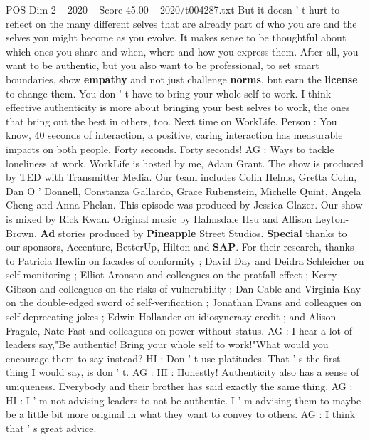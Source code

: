\begin{textsample}{POS Dim 2 – 2020 – Score 45.00 – 2020/t004287.txt}
But it doesn ' t hurt to reflect on the many different selves that are already part of who you are and the selves you might become as you evolve.
It makes sense to be thoughtful about which ones you share and when, where and how you express them.
After all, you want to be authentic, but you also want to be professional, to set smart boundaries, show \textbf{empathy} and not just challenge \textbf{norms}, but earn the \textbf{license} to change them.
You don ' t have to bring your whole self to work.
I think effective authenticity is more about bringing your best selves to work, the ones that bring out the best in others, too.
Next time on WorkLife.
Person : You know, 40 seconds of interaction, a positive, caring interaction has measurable impacts on both people.
Forty seconds.
Forty seconds!
AG : Ways to tackle loneliness at work.
WorkLife is hosted by me, Adam Grant.
The show is produced by TED with Transmitter Media.
Our team includes Colin Helms, Gretta Cohn, Dan O ' Donnell, Constanza Gallardo, Grace Rubenstein, Michelle Quint, Angela Cheng and Anna Phelan.
This episode was produced by Jessica Glazer.
Our show is mixed by Rick Kwan.
Original music by Hahnsdale Hsu and Allison Leyton-Brown. \textbf{Ad} stories produced by \textbf{Pineapple} Street Studios. \textbf{Special} thanks to our sponsors, Accenture, BetterUp, Hilton and \textbf{SAP}.
For their research, thanks to Patricia Hewlin on facades of conformity ; David Day and Deidra Schleicher on self-monitoring ; Elliot Aronson and colleagues on the pratfall effect ; Kerry Gibson and colleagues on the risks of vulnerability ; Dan Cable and Virginia Kay on the double-edged sword of self-verification ; Jonathan Evans and colleagues on self-deprecating jokes ; Edwin Hollander on idiosyncrasy credit ; and Alison Fragale, Nate Fast and colleagues on power without status.
AG : I hear a lot of leaders say,"Be authentic!
Bring your whole self to work!"What would you encourage them to say instead?
HI : Don ' t use platitudes.
That ' s the first thing I would say, is don ' t.
AG : HI : Honestly!
Authenticity also has a sense of uniqueness.
Everybody and their brother has said exactly the same thing.
AG : HI : I ' m not advising leaders to not be authentic.
I ' m advising them to maybe be a little bit more original in what they want to convey to others.
AG : I think that ' s great advice.

\end{textsample}
